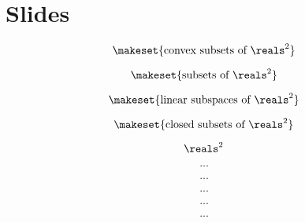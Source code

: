 
\section{Slides}

\begin{forslides}

    \begin{equation}
        \label{eq:slides_adjunctions_1}
      \makeset{\text{convex subsets of } \reals^2}
    \end{equation}
    
     \begin{equation}
        \label{eq:slides_adjunctions_2}
       \makeset{\text{subsets of } \reals^2}
    \end{equation}
    
     \begin{equation}
        \label{eq:slides_adjunctions_3}
      \makeset{\text{linear subspaces of } \reals^2}
    \end{equation}
    
     \begin{equation}
        \label{eq:slides_adjunctions_4}
       \makeset{\text{closed subsets of } \reals^2}
    \end{equation}
    
     \begin{equation}
        \label{eq:slides_adjunctions_5}
     \reals^2
    \end{equation}
    
     \begin{equation}
        \label{eq:slides_adjunctions_6}
       ...
    \end{equation}
    
     \begin{equation}
        \label{eq:slides_adjunctions_7}
       ...
    \end{equation}
    
     \begin{equation}
        \label{eq:slides_adjunctions_8}
       ...
    \end{equation}
    
     \begin{equation}
        \label{eq:slides_adjunctions_9}
        ...
    \end{equation}
    
     \begin{equation}
        \label{eq:slides_adjunctions_10}
       ...
    \end{equation}
    

\end{forslides}
